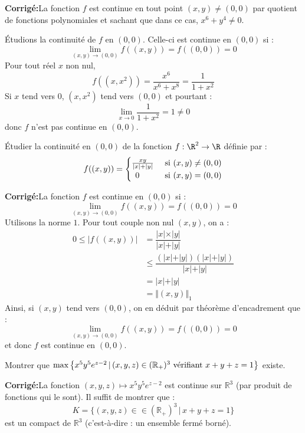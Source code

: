 \documentclass[a4paper,twoside,french,11pt]{VcCours}
\newcommand{\corr}{\textbf{Corrigé:}}
\begin{document}
\corr La fonction $f$ est continue en tout point $(x,y) \neq (0,0)$ par quotient de fonctions polynomiales et sachant que dans ce cas, $x^6+y^4 \neq 0$. 


Étudions la continuité de $f$ en $(0,0)$. Celle-ci est continue en $(0,0)$ si :
$$ \lim_{(x,y) \rightarrow (0,0)} f((x,y)) =f((0,0))= 0$$
Pour tout réel $x$ non nul,
$$ f((x,x^2)) = \dfrac{x^6}{x^6+x^8} = \dfrac{1}{1+x^2}$$
Si $x$ tend vers $0$, $(x,x^2)$ tend vers $(0,0)$ et pourtant :
$$ \lim_{x \rightarrow 0} \dfrac{1}{1+x^2} = 1 \neq 0$$
donc $f$ n'est pas continue en $(0,0)$.

\begin{Exercice}{} Étudier la continuité en $(0,0)$ de la fonction $f : \R^{2} \rightarrow \R$ définie par :
  \[
  f((x,y)) =
  \begin{cases}
    \frac{xy}{\vert x \vert + \vert y \vert} & \hbox{ si } (x,y) \neq (0,0) \\
    \, \; 0 & \hbox{ si } (x,y)=(0,0)
  \end{cases}
  \]
\end{Exercice}

\corr La fonction $f$ est continue en $(0,0)$ si :
$$ \lim_{(x,y) \rightarrow (0,0)} f((x,y)) =f((0,0))= 0$$
Utilisons la norme $1$. Pour tout couple non nul $(x,y)$, on a :
\begin{align*}
0 \leq \vert f((x,y)) \vert & = \dfrac{\vert x \vert \times \vert y \vert}{\vert x \vert + \vert y \vert} \\
& \leq \dfrac{(\vert x \vert + \vert y \vert)(\vert x \vert + \vert y \vert)}{\vert x \vert + \vert y \vert} \\
& = \vert x \vert + \vert y \vert \\
& = \Vert (x,y) \Vert_1
\end{align*}
Ainsi, si $(x,y)$ tend vers $(0,0)$, on en déduit par théorème d'encadrement que :
$$  \lim_{(x,y) \rightarrow (0,0)} f((x,y)) =f((0,0))= 0$$
et donc $f$ est continue en $(0,0)$.




\begin{Exercice}{} Montrer que $\max \left\lbrace x^5y^5 e^{z-2} \, \vert \, (x,y,z) \in (\mathbb{R}_+)^3 \hbox{ vérifiant } x+y+z =1 \right\rbrace$ existe.
\end{Exercice}

\corr La fonction $(x,y,z) \mapsto x^5y^5 e^{z-2}$ est continue sur $\mathbb{R}^3$ (par produit de fonctions qui le sont). Il suffit de montrer que :
$$K= \lbrace (x,y,z) \in \in (\mathbb{R}_+)^3 \, \vert \, x+y+z=1 \rbrace$$
est un compact de $\mathbb{R}^3$ (c'est-à-dire : un ensemble fermé borné).
\end{document}
